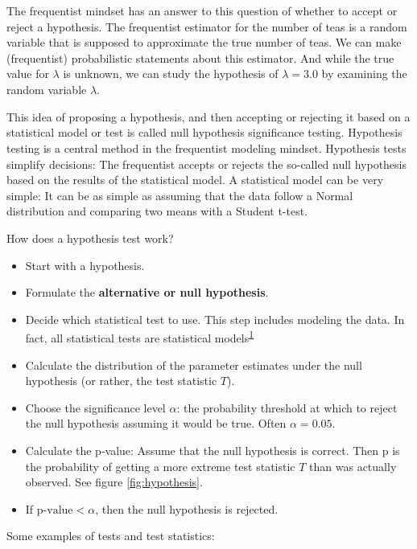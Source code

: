 \documentclass[
  10pt,
]{scrbook}
\providecommand{\tightlist}{%
  \setlength{\itemsep}{0pt}\setlength{\parskip}{0pt}}
\begin{document}
The frequentist mindset has an answer to this question of whether to accept or reject a hypothesis.
The frequentist estimator for the number of teas is a random variable that is supposed to approximate the true number of teas.
We can make (frequentist) probabilistic statements about this estimator.
And while the true value for \(\lambda\) is unknown, we can study the hypothesis of \(\lambda = 3.0\) by examining the random variable \(\hat{\lambda}\).

This idea of proposing a hypothesis, and then accepting or rejecting it based on a statistical model or test is called null hypothesis significance testing.
Hypothesis testing is a central method in the frequentist modeling mindset.
Hypothesis tests simplify decisions:
The frequentist accepts or rejects the so-called null hypothesis based on the results of the statistical model.
A statistical model can be very simple:
It can be as simple as assuming that the data follow a Normal distribution and comparing two means with a Student t-test.

How does a hypothesis test work?

\begin{itemize}
\tightlist
\item
  Start with a hypothesis.
\item
  Formulate the \textbf{alternative or null hypothesis}.
\item
  Decide which statistical test to use. This step includes modeling the data. In fact, all statistical tests are statistical models\textsuperscript{\protect\hyperlink{ref-mcelreath2020statistical}{1}}
\item
  Calculate the distribution of the parameter estimates under the null hypothesis (or rather, the test statistic \(T\)).
\item
  Choose the significance level \(\alpha\): the probability threshold at which to reject the null hypothesis assuming it would be true. Often \(\alpha = 0.05\).
\item
  Calculate the p-value: Assume that the null hypothesis is correct. Then p is the probability of getting a more extreme test statistic \(T\) than was actually observed. See figure \ref{fig:hypothesis}.
\item
  If \(\text{p-value} <\alpha\), then the null hypothesis is rejected.
\end{itemize}

Some examples of tests and test statistics:
\end{document}
